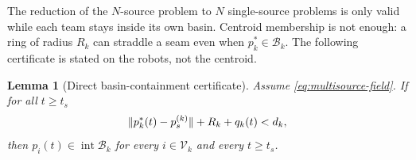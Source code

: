 \documentclass[11pt,a4paper]{article}
\theoremstyle{plain}
\newtheorem{lemma}{Lemma}
\theoremstyle{definition}
\newcommand{\V}{\mathcal{V}}
\DeclarePairedDelimiter{\norm}{\lVert}{\rVert}
\begin{document}
The reduction of the $N$-source problem to $N$ single-source problems is only valid while each
team stays inside its own basin. Centroid membership is not enough: a ring of radius $R_k$ can
straddle a seam even when $p_k^*\in\mathcal{B}_k$. The following certificate is stated on the
robots, not the centroid.

\begin{lemma}[Direct basin-containment certificate]\label{lem:basin-certificate}
Assume \eqref{eq:multisource-field}. If for all $t\geq t_s$
\begin{equation}\label{eq:basin-certificate}
    \norm{p_k^*(t)-p_s^{(k)}}+R_k+q_k(t)<d_k,
\end{equation}
then $p_i(t)\in\operatorname{int}\mathcal{B}_k$ for every $i\in\V_k$ and every $t\geq t_s$.
\end{lemma}
\end{document}
